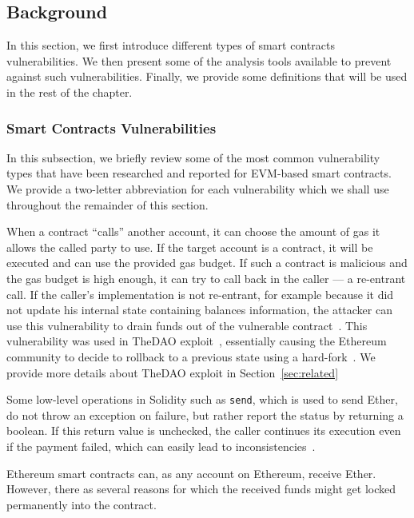 \subsection{Background}
\label{sec:background} 
In this section, we first introduce different types of smart contracts vulnerabilities.
We then present some of the analysis tools available to prevent against such vulnerabilities.
Finally, we provide some definitions that will be used in the rest of the chapter.

\subsubsection{Smart Contracts Vulnerabilities}
\label{ssec:vulnerability-types}
In this subsection, we briefly review some of the most common vulnerability types that have been researched and reported for EVM-based smart contracts.
We provide a two-letter abbreviation for each vulnerability which we shall use throughout the remainder of this section.

\point{\reentrancy~(\vre)}
When a contract ``calls'' another account, it can choose the amount of gas it allows the called party to use. If the target account is a contract, it will be executed and can use the provided gas budget. If such a contract is malicious and the gas budget is high enough, it can try to call back in the caller --- a re-entrant call. If the caller's implementation is not re-entrant, for example because it did not update his internal state containing balances information, the attacker can use this vulnerability to drain funds out of the vulnerable contract~\cite{Luu2016a,DBLP:conf/ndss/KalraGDS18,Tsankov2018}.
This vulnerability was used in TheDAO exploit~\cite{Securities2017}, essentially causing the Ethereum community to decide to rollback to a previous state using a hard-fork~\cite{mehar2019understanding}. We provide more details about TheDAO exploit in Section~\ref{sec:related}

\point{\unhandledexceptions~(\vue)}
Some low-level operations in Solidity such as \lstinline{send}, which is used to send Ether, do not throw an exception on failure, but rather report the status by returning a boolean. If this return value is unchecked, the caller continues its execution even if the payment failed, which can easily lead to inconsistencies~\cite{Brent2018,Luu2016a,Tikhomirov2017,DBLP:conf/ndss/KalraGDS18}.

\point{\lockedether~(\vle)}
Ethereum smart contracts can, as any account on Ethereum, receive Ether. However, there as several reasons for which the received funds might get locked permanently into the contract.

